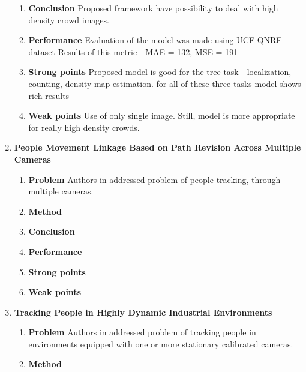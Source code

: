 \begin{enumerate}
\begin{enumerate}
        \item \textbf{Conclusion}
        Proposed framework have possibility to deal with high density crowd images.
        \item \textbf{Performance}
        Evaluation of the model was made using UCF-QNRF dataset \cite{idrees2018composition} 
        Results of this metric - MAE = 132, MSE = 191
        \item \textbf{Strong points}
        Proposed model is good for the tree task - localization, counting, density map estimation. for all of these three tasks model shows rich results 
        \item \textbf{Weak points}
        Use of only single image. Still, model is more appropriate for really high density crowds.
    \end{enumerate}
    \item \textbf{People Movement Linkage Based on Path Revision Across Multiple Cameras}
    \begin{enumerate}
        \item \textbf{Problem}
        Authors in \cite{JIT2350} addressed problem of people tracking, through multiple cameras.
        \item \textbf{Method}
        
        \item \textbf{Conclusion}
        
        \item \textbf{Performance}
        
        \item \textbf{Strong points}
        \item \textbf{Weak points}
    \end{enumerate}
    \item \textbf{Tracking People in Highly Dynamic Industrial Environments}
    \begin{enumerate}
        \item \textbf{Problem}
        Authors in \cite{7576696} addressed problem of tracking people in environments equipped with one or more stationary calibrated cameras.
        \item \textbf{Method}
        

\end{enumerate}
\end{enumerate}
